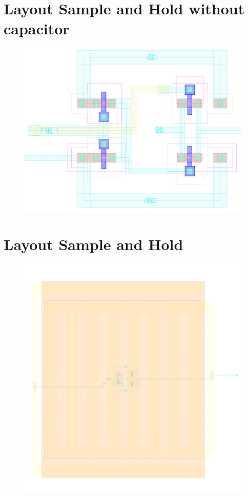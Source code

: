 \documentclass[english, 12pt, a4paper]{ifimaster}
\begin{document}
\begin{appendices}
\newpage
\section{Layout Sample and Hold without capacitor}
\begin{figure}[!ht]
 \centering
 \includegraphics[width=20cm, angle=90]{img/layout/sample_hold_u_cap}
\end{figure}

\newpage
\section{Layout Sample and Hold}
\begin{figure}[!ht]
 \centering
 \includegraphics[width=15cm, angle=90]{img/layout/sample_hold}
\end{figure}


\end{appendices}
\end{document}
